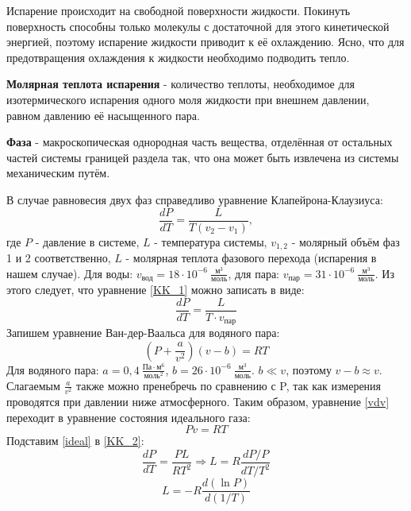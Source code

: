 \documentclass[15pt,a5paper,reqno]{article}
\begin{document}
    Испарение происходит на свободной поверхности жидкости. Покинуть поверхность способны только молекулы с достаточной для этого кинетической энергией, поэтому испарение жидкости приводит к её охлаждению. Ясно, что для предотвращения охлаждения к жидкости необходимо подводить тепло.
    
    \textbf{Молярная теплота испарения} - количество теплоты, необходимое для изотермического испарения одного моля жидкости при внешнем давлении, равном давлению её насыщенного пара.
    
    \textbf{Фаза} - макроскопическая однородная часть вещества, отделённая от остальных частей системы границей раздела так, что она может быть извлечена из системы механическим путём.
    
    В случае равновесия двух фаз справедливо уравнение Клапейрона-Клаузиуса:
    \begin{equation}\label{KK_1}
        \frac{dP}{dT} = \frac{L}{T(v_2 - v_1)},
    \end{equation}
    где $P$ - давление в системе, $L$ - температура системы, $v_{1, 2}$ - молярный объём фаз 1 и 2 соответственно, $L$ - молярная теплота фазового перехода (испарения в нашем случае). Для воды: $v_{\text{вод}} = 18\cdot 10^{-6}\ \frac{\text{м}^3}{\text{моль}}$, для пара: $v_{\text{пар}} = 31\cdot 10^{-6}\ \frac{\text{м}^3}{\text{моль}}$. Из этого следует, что уравнение \eqref{KK_1} можно записать в виде:
    \begin{equation}\label{KK_2}
        \frac{dP}{dT} = \frac{L}{T\cdot v_{\text{пар}}}
    \end{equation}
    Запишем уравнение Ван-дер-Ваальса для водяного пара:
    \begin{equation}\label{vdv}
        (P + \frac{a}{v^2})(v - b) = RT
    \end{equation}
    Для водяного пара: $a = 0,4\ \frac{\text{Па}\cdot\text{м}^6}{\text{моль}^2}$, $b = 26\cdot 10^{-6}\ \frac{\text{м}^3}{\text{моль}}$. $b \ll v$, поэтому $v - b\approx v$. Слагаемым $\frac{a}{v^2}$ также можно пренебречь по сравнению с P, так как измерения проводятся при давлении ниже атмосферного. Таким образом, уравнение \eqref{vdv} переходит в уравнение состояния идеального газа:
    \begin{equation}\label{ideal}
        Pv = RT
    \end{equation}
    Подставим \eqref{ideal} в \eqref{KK_2}:
    \[\frac{dP}{dT} = \frac{PL}{RT^2} \Rightarrow L = R\frac{dP / P}{dT / T^2}\]
    \begin{equation}\label{final}
        L = -R\frac{d(\ln{P})}{d(1/T)}
    \end{equation}
    
\end{document}
